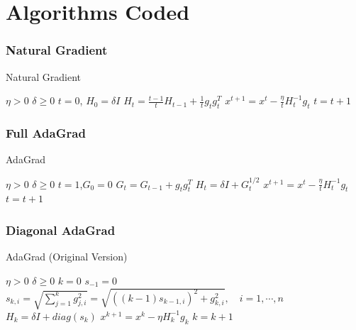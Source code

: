 \documentclass[12pt]{article}
\begin{document}
\section{Algorithms Coded}

\subsubsection{Natural Gradient}

\begin{algorithm}[H]
\caption{Natural Gradient}
\label{alg1}
\begin{algorithmic}[1]
\REQUIRE  $\eta>0$ $\delta \geq 0$
\STATE  $t=0$, $H_0 = \delta I $
\STATE $H_t = \frac{t-1}{t}H_{t-1}+ \frac{1}{t}g_t  g_t^T$
\STATE $x^{t+1} = x^t - \frac{\eta}{t} H_t^{-1} g_t$
\STATE $t=t+1$
\ENDWHILE
\end{algorithmic}
\end{algorithm}


\subsubsection{Full AdaGrad}

\begin{algorithm}[H]
\caption{AdaGrad}
\label{alg1}
\begin{algorithmic}[1]
\REQUIRE  $\eta>0$ $\delta \geq 0$
\STATE  $t=1$,$G_{0}=0$
\STATE $G_t = G_{t-1}+ g_t  g_t^T$
\STATE $H_t = \delta I + G_t^{1/2}$
\STATE $x^{t+1} = x^t - \frac{\eta}{t} H_t^{-1} g_t$
\STATE $t=t+1$
\ENDWHILE
\end{algorithmic}
\end{algorithm}

\subsubsection{Diagonal AdaGrad}

\begin{algorithm}[H]
\caption{AdaGrad (Original Version)}
\label{ada1}
\begin{algorithmic}[1]
\REQUIRE  $\eta>0$ $\delta \geq 0$
\STATE  $k=0$ $s_{-1}=0$
\STATE $s_{k,i} =\sqrt{   \sum_{j=1}^k g_{j,i}^2   }  =\sqrt{ ((k-1) s_{k-1,i})^2 +g_{k,i}^2 }, \quad i=1, \cdots, n  $
\STATE $H_k =\delta I + diag(s_k)$
\STATE $x^{k+1} = x^k - \eta H_k^{-1} g_k$
\STATE $k=k+1$
\ENDWHILE
\end{algorithmic}
\end{algorithm}
\end{document}
